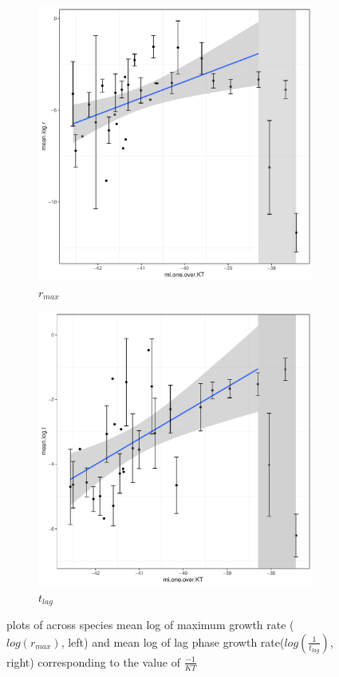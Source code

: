 \begin{figure}[htb]
    \begin{subfigure}{.47\textwidth}
      \centering
      \includegraphics[width=.9\linewidth]{Plot/log_mean_r_KT.pdf}
      \caption{$r_{max}$}
      \label{fig:log_mean_r_KT}
    \end{subfigure}
    \begin{subfigure}{.47\textwidth}
      \centering
      \includegraphics[width=.9\linewidth]{Plot/log_mean_tlag_KT.pdf}
      \caption{$t_{lag}$}
      \label{fig:log_mean_tlag_KT}
    \end{subfigure}
\caption{plots of across species mean log of maximum growth rate ($log(r_{max})$, left) and mean log of lag phase growth rate($log(\frac{1}{t_{lag}})$, right) corresponding to the value of $\frac{-1}{KT}$}
\label{fig:mean_rate_KT}
\end{figure}


